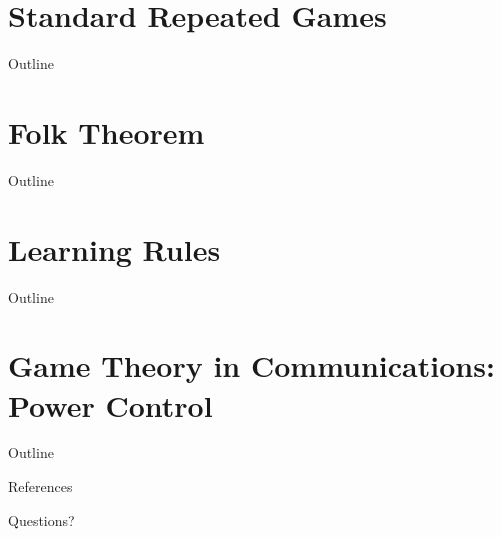 \documentclass[10pt, handout]{beamer}
\begin{document}


\section{Standard Repeated Games}
\begin{frame}{Outline}
    \tableofcontents[currentsection]
\end{frame}



\section{Folk Theorem}
\begin{frame}{Outline}
    \tableofcontents[currentsection]
\end{frame}



\section{Learning Rules}
\begin{frame}{Outline}
    \tableofcontents[currentsection]
\end{frame}



\section{Game Theory in Communications: Power Control}
\begin{frame}{Outline}
    \tableofcontents[currentsection]
\end{frame}



\begin{frame}{References}
    \nocite{*}
    
    
\end{frame}

\begin{frame}[standout]
    Questions?
\end{frame}
\end{document}
